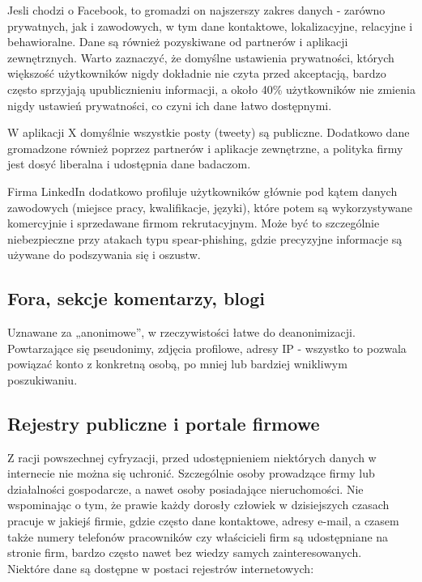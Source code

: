 Jesli chodzi o Facebook, to gromadzi on najszerszy zakres danych - zarówno prywatnych, jak i zawodowych, w tym dane kontaktowe, lokalizacyjne, relacyjne i behawioralne. Dane są również pozyskiwane od partnerów i aplikacji zewnętrznych. Warto zaznaczyć, że domyślne ustawienia prywatności, których większość użytkowników nigdy dokładnie nie czyta przed akceptacją, bardzo często sprzyjają upublicznieniu informacji, a około 40\% użytkowników nie zmienia nigdy ustawień prywatności, co czyni ich dane łatwo dostępnymi.

W aplikacji X domyślnie wszystkie posty (tweety) są publiczne. Dodatkowo dane gromadzone również poprzez partnerów i aplikacje zewnętrzne, a polityka firmy jest dosyć liberalna i udostępnia dane badaczom.

Firma LinkedIn dodatkowo profiluje użytkowników głównie pod kątem danych zawodowych (miejsce pracy, kwalifikacje, języki), które potem są wykorzystywane komercyjnie i sprzedawane firmom rekrutacyjnym. Może być to szczególnie niebezpieczne przy atakach typu spear-phishing, gdzie precyzyjne informacje są używane do podszywania się i oszustw.

\subsection{Fora, sekcje komentarzy, blogi}

Uznawane za „anonimowe”, w rzeczywistości łatwe do deanonimizacji. Powtarzające się pseudonimy, zdjęcia profilowe, adresy IP - wszystko to pozwala powiązać konto z konkretną osobą, po mniej lub bardziej wnikliwym poszukiwaniu.

\subsection{Rejestry publiczne i portale firmowe \cite{zrodloDzialalnosc}}
Z racji powszechnej cyfryzacji, przed udostępnieniem niektórych danych w internecie nie można się uchronić. Szczególnie osoby prowadzące firmy lub działalności gospodarcze, a nawet osoby posiadające nieruchomości. 
Nie wspominając o tym, że prawie każdy dorosły człowiek w dzisiejszych czasach pracuje w jakiejś firmie, gdzie często dane kontaktowe, adresy e-mail, a czasem także numery telefonów pracowników czy właścicieli firm są udostępniane na stronie firm, bardzo często nawet bez wiedzy samych zainteresowanych. \\
Niektóre dane są dostępne w postaci rejestrów internetowych:


